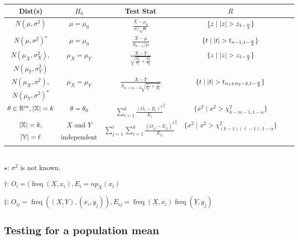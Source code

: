 \documentclass[12pt]{article}
\theoremstyle{definition}
\DeclarePairedDelimiter\abs{\lvert}{\rvert}
\newcommand{\R}{\mathbb{R}}
\newcommand{\X}{\mathbb{X}}
\newcommand{\Y}{\mathbb{Y}}
\newcommand{\mr}[1]{\multirow{2}{*}{#1}}
\DeclareMathOperator{\freq}{freq}
\begin{document}
\newpage
\begin{tabular}{c c c c c c}
  \toprule
  Dist(s)                 & $H_0$                & Test Stat & $R$ \\
  \midrule
  $N(\mu, \sigma^2)$      & $\mu = \mu_0$        & $\frac{\overline{X} - \mu_0}{\sigma / \sqrt{n}}$ & $\{z \mid \abs{z} > z_{1 - \frac{\alpha}{2}}\}$\\
  \addlinespace
  $N(\mu, \sigma^2)^\star$      & $\mu = \mu_0$        & $\frac{\overline{X} - \mu}{S_{n - 1} / \mu}$     & $\{t \mid \abs{t} > t_{n - 1, 1 - \frac{\alpha}{2}}\}$\\
  \addlinespace
  $N(\mu_X, \sigma^2_X),$ & \mr{$\mu_X = \mu_Y$} & \mr{$\frac{\overline{X} - \overline{Y}}{\sqrt{\frac{\sigma^2_X}{n_1} + \frac{\sigma^2_Y}{n_2}}}$} & \mr{$\{z \mid \abs{z} > z_{1 - \frac{\alpha}{2}}\}$} \\
  $N(\mu_Y, \sigma^2_Y)$  & & & \\
  \addlinespace
  $N(\mu_X, \sigma^2),$   & \mr{$\mu_X = \mu_Y$} & \mr{$\frac{\overline{X} - \overline{Y}}{S_{n_1 + n_2 - 2}\sqrt{\frac{1}{n_1} + \frac{1}{n_2}}}$} & \mr{$\{t \mid \abs{t} > t_{n_1 + n_2 - 2, 1 - \frac{\alpha}{2}}\}$} \\
  $N(\mu_Y, \sigma^2)^\star$    & & & \\
  \addlinespace
  $\theta \in \R^m, \abs{\X} = k$ & $\theta = \theta_0$  & $\sum\limits_{i = 1}^k\frac{(O_i - E_i)^2}{E_i}^\dag$ & $\{x^2 \mid x^2 > \chi^2_{k - m - 1,1-\alpha}\}$ \\
  \addlinespace
  $\abs{\X} = k,$          & $X$ and $Y$          & \mr{$\sum\limits_{j = 1}^\ell\sum\limits_{i = 1}^k\frac{(O_{ij} - E_{ij})^2}{E_{ij}}^\ddag$} & \mr{$\{x^2 \mid x^2 > \chi^2_{(k - 1)(\ell - 1),1-\alpha}\}$} \\
  $\abs{\Y} = \ell$        & independent      & & \\
  \addlinespace
  \bottomrule
\end{tabular}
\\

$\star$: $\sigma^2$ is not known.

$\dag$: $O_i = (\freq(\underline{X}, x_i), E_i = np_X(x_i)$

$\ddag$: $O_{ij} = \freq\left(\underline{(X, Y)}, (x_i, y_j)\right), E_{ij} = \freq(\underline{X}, x_i)\freq(\underline{Y}, y_j)$

\subsection{Testing for a population mean}
\end{document}
